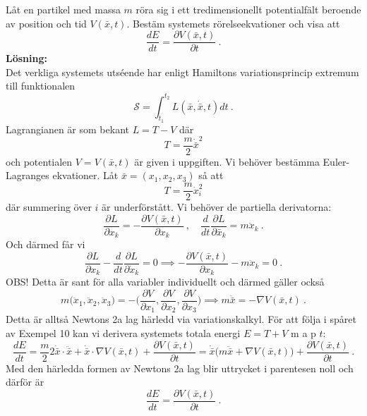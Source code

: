 \documentclass{article}
\begin{document}
Låt en partikel med massa $m$ röra sig i ett tredimensionellt potentialfält beroende av position och tid $V(\bar{x},t)$. Bestäm systemets rörelseekvationer och visa att
$$
\frac{dE}{dt}=\frac{\partial V(\bar{x},t)}{\partial t} \ .
$$
\textbf{Lösning:}\\
Det verkliga systemets utséende har enligt Hamiltons variationsprincip extremum till funktionalen
$$
\mathcal{S}=\int_{t_1}^{t_2}L(\bar{x},\dot{\bar{x}},t)dt \ .
$$
Lagrangianen är som bekant $L=T-V$ där
$$
T=\frac{m}{2}\dot{\bar{x}}^2
$$
och potentialen $V=V(\bar{x},t)$ är given i uppgiften. Vi behöver bestämma Euler-Lagranges ekvationer. Låt $\bar{x}=(x_1,x_2,x_3)$ så att
$$
T=\frac{m}{2}\dot{x}_i^2
$$
där summering över $i$ är underförstått. Vi behöver de partiella derivatorna:
$$
\frac{\partial L}{\partial x_k}=-\frac{\partial V(\bar{x},t)}{\partial x_k} \ , \quad \frac{d}{dt}\frac{\partial L}{\partial \bar{x}_k}=m\ddot{x}_k \ .
$$
Och därmed får vi
$$
\frac{\partial L}{\partial x_k}-\frac{d}{dt}\frac{\partial L}{\partial \dot{x}_k}=0 \implies -\frac{\partial V(\bar{x},t)}{\partial x_k}-m\ddot{x}_k=0 \ .
$$
OBS! Detta är sant för alla variabler individuellt och därmed gäller också
$$
m\big(\ddot{x}_1,\ddot{x}_2,\ddot{x}_3\big)=-\Big(\frac{\partial V}{\partial x_1},\frac{\partial V}{\partial x_2},\frac{\partial V}{\partial x_3}\Big) \implies m\ddot{\bar{x}}=-\nabla V(\bar{x},t) \ .
$$
Detta är alltså Newtons 2a lag härledd via variationskalkyl. För att följa i spåret av Exempel 10 kan vi derivera systemets totala energi $E=T+V$ m a p $t$:
$$
\frac{dE}{dt}=\frac{m}{2}2\dot{\bar{x}}\cdot\ddot{\bar{x}}+\dot{\bar{x}}\cdot\nabla V(\bar{x},t)+\frac{\partial V(\bar{x},t)}{\partial t}=\dot{\bar{x}}\big(m\ddot{\bar{x}}+\nabla V(\bar{x},t)\big)+\frac{\partial V(\bar{x},t)}{\partial t} \ .
$$
Med den härledda formen av Newtons 2a lag blir uttrycket i parentesen noll och därför är
$$
\frac{dE}{dt}=\frac{\partial V(\bar{x},t)}{\partial t} \ .
$$
\end{document}
